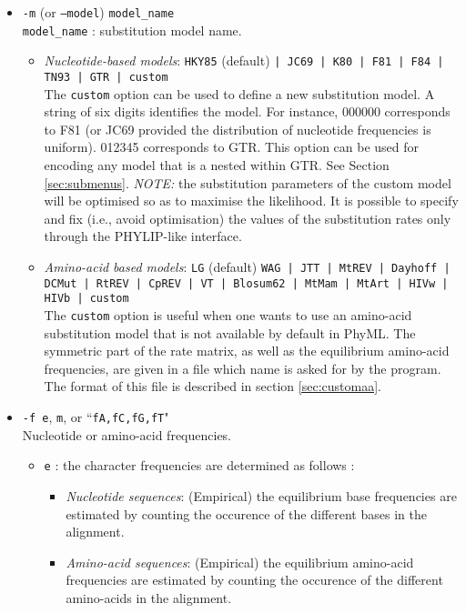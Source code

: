 \documentclass[a4paper,12pt]{article}
\newcommand{\x}[1]{\texttt{#1}}
\begin{document}
\begin{itemize}
\item \x{-m} (or \x{--model}) \x{model\_name} \\
\x{model\_name} : substitution model name.
\begin{itemize}
\item {\it Nucleotide-based models}: \x{HKY85} (default) \x{| JC69 |  K80 | F81 | F84 | TN93 | GTR |
custom} \\  The \x{custom} option can be  used to define a  new substitution model. A  string of six
digits  identifies  the model.  For  instance,  000000 corresponds  to  F81  (or  JC69 provided  the
distribution of nucleotide  frequencies is uniform).  012345 corresponds to GTR.  This option can be
used for encoding any model that is a nested within GTR. See Section \ref{sec:submenus}. {\em NOTE:}
the  substitution  parameters  of  the  custom  model  will be  optimised  so  as  to  maximise  the
likelihood.  It is  possible  to  specify and  fix  (i.e., avoid  optimisation)  the  values of  the
substitution rates only through the PHYLIP-like interface.

\item {\it Amino-acid based models}: \x{LG} (default) \x{WAG | JTT | MtREV | Dayhoff | DCMut | RtREV
 | CpREV | VT | Blosum62 | MtMam | MtArt | HIVw |  HIVb | custom} \\
The \x{custom} option is  useful when one wants to use an amino-acid  substitution model that is not
available by  default in PhyML. The  symmetric part of the  rate matrix, as well  as the equilibrium
amino-acid frequencies, are  given in a file which name  is asked for by the  program. The format of
this file is described in section \ref{sec:customaa}.
\end{itemize}

\item \x{-f e}, \x{m}, or ``\x{fA,fC,fG,fT}" \\
Nucleotide or amino-acid frequencies.
\begin{itemize}
\item \x{e} : the character frequencies are determined as follows : 
\begin{itemize}
\item {\it Nucleotide sequences}: (Empirical) the equilibrium base frequencies are estimated by counting
                 the occurence of the different bases in the alignment. 
\item {\it Amino-acid sequences}: (Empirical) the equilibrium amino-acid frequencies are estimated by counting
                 the occurence of the different amino-acids in the alignment.
\end{itemize}  


\end{itemize}
\end{itemize}
\end{document}
